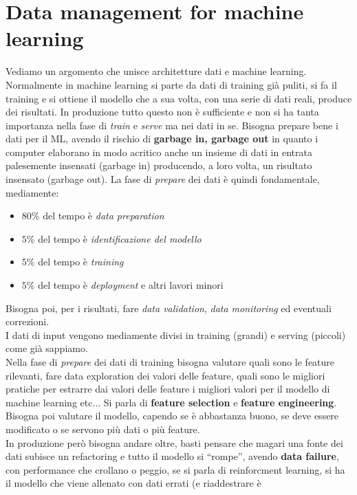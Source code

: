\documentclass[a4paper,12pt, oneside]{book}
\begin{document}
\chapter{Data management for machine learning}
Vediamo un argomento che unisce architetture dati e machine learning.\\
Normalmente in machine learning si parte da dati di training già puliti, si fa
il training e si ottiene il modello che a sua volta, con una serie di dati
reali, produce dei risultati. In produzione tutto questo non è sufficiente e non
si ha tanta importanza nella fase di \textit{train} e \textit{serve} ma nei dati
in 
se. Bisogna prepare bene i dati per il ML, avendo il rischio di \textbf{garbage
  in, garbage out} in quanto i computer elaborano in modo acritico anche un
insieme di dati in entrata palesemente insensati (garbage in) producendo, a loro
volta, un risultato insensato (garbage out). La fase di \textit{prepare} dei
dati è quindi fondamentale, mediamente:
\begin{itemize}
  \item $80\%$ del tempo è \textit{data preparation}
  \item $5\%$ del tempo è \textit{identificazione del modello}
  \item $5\%$ del tempo è \textit{training}
  \item $5\%$ del tempo è \textit{deployment} e altri lavori minori 
\end{itemize}
Bisogna poi, per i risultati, fare \textit{data validation}, \textit{data
  monitoring} ed eventuali correzioni.\\
I dati di input vengono mediamente divisi in training (grandi) e serving
(piccoli) come già sappiamo.\\
Nella fase di \textit{prepare} dei dati di training bisogna valutare quali sono
le 
feature rilevanti, fare data exploration dei valori delle feature, quali sono le
migliori pratiche per estrarre dai valori delle feature i migliori valori per il
modello di machine learning etc$\ldots$ Si parla di \textbf{feature selection} e
\textbf{feature engineering}. Bisogna poi valutare il modello, capendo se è
abbastanza buono, se deve essere modificato o se servono più dati o più
feature.\\
In produzione però bisogna andare oltre, basti pensare che magari una fonte dei
dati subisce un refactoring e tutto il modello si ``rompe'', avendo \textbf{data
failure}, con performance che crollano o peggio, se si parla di reinforcment
learning, si ha il modello che viene allenato con dati errati (e riaddestrare è
\end{document}
